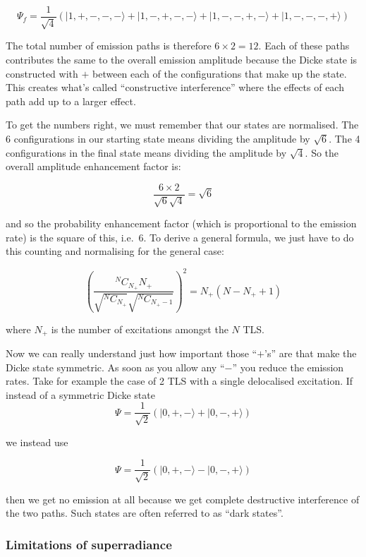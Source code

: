 \documentclass[
]{article}
\renewcommand{\[}{\begin{equation}}
\renewcommand{\]}{\end{equation}}
\begin{document}
\[
\Psi_f = \frac{1}{\sqrt{4}}\left(| 1, +, -, -, - \rangle + | 1, -, +, -, - \rangle + | 1, -, -, +, - \rangle + | 1, -, -, -, + \rangle \right)
\]

The total number of emission paths is therefore \(6\times 2 = 12\). Each
of these paths contributes the same to the overall emission amplitude
because the Dicke state is constructed with \(+\) between each of the
configurations that make up the state. This creates what's called
``constructive interference'' where the effects of each path add up to a
larger effect.

To get the numbers right, we must remember that our states are
normalised. The 6 configurations in our starting state means dividing
the amplitude by \(\sqrt{6}\). The 4 configurations in the final state
means dividing the amplitude by \(\sqrt{4}\). So the overall amplitude
enhancement factor is:

\[
\frac{6\times 2}{\sqrt{6}\sqrt{4}} = \sqrt{6}
\]

and so the probability enhancement factor (which is proportional to the
emission rate) is the square of this, i.e.~6. To derive a general
formula, we just have to do this counting and normalising for the
general case:

\[
\left(\frac{^N C_{N_+} N_+}{\sqrt{^N C_{N_+}}\sqrt{^N C_{{N_+}-1}}}\right)^2 = N_+\left(N-N_++1\right)
\]

where \(N_+\) is the number of excitations amongst the \(N\) TLS.

Now we can really understand just how important those ``\(+\)'s'' are
that make the Dicke state symmetric. As soon as you allow any ``\(-\)''
you reduce the emission rates. Take for example the case of 2 TLS with a
single delocalised excitation. If instead of a symmetric Dicke state \[
\Psi = \frac{1}{\sqrt{2}}\left(| 0, +, -\rangle + | 0, -, + \rangle \right)
\]

we instead use

\[
\Psi = \frac{1}{\sqrt{2}}\left(| 0, +, -\rangle - | 0, -, + \rangle \right)
\]

then we get no emission at all because we get complete destructive
interference of the two paths. Such states are often referred to as
``dark states''.

\subsubsection{Limitations of
superradiance}\label{limitations-of-superradiance}
\end{document}
